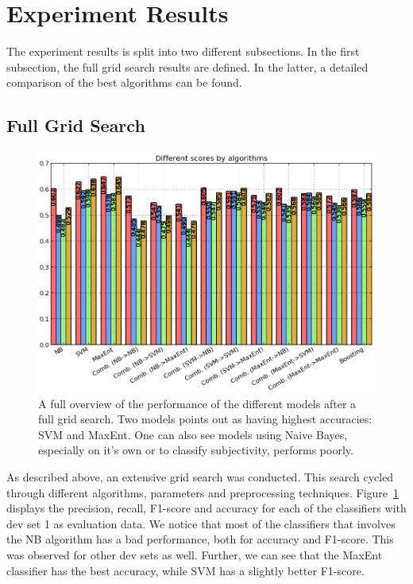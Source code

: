 \section{Experiment Results}
\label{sec:results}

The experiment results is split into two different subsections. In the first subsection, the full grid search results are defined. In the latter, a detailed comparison of the best algorithms can be found.

\subsection{Full Grid Search}

\begin{figure}
 \begin{center}
     \includegraphics[width=\linewidth]{../img/plots/grid/full_biggersize.png}
 \end{center}
 \caption[Results overview across all models]{A full overview of the performance of the different models after a full grid search. Two models points out as having highest accuracies: SVM and MaxEnt. One can also see models using Naive Bayes, especially on it's own or to classify subjectivity, performs poorly.}
 \label{fig:results_full}
\end{figure}

As described above, an extensive grid search was conducted. This search cycled through different algorithms, parameters and preprocessing techniques. Figure~\ref{fig:results_full} displays the precision, recall, F1-score and accuracy for each of the classifiers with dev set 1 as evaluation data. We notice that most of the classifiers that involves the NB algorithm has a bad performance, both for accuracy and F1-score. This was observed for other dev sets as well. Further, we can see that the MaxEnt classifier has the best accuracy, while SVM has a slightly better F1-score.

